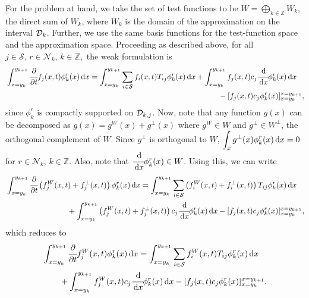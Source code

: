 For the problem at hand, we take the set of test functions to be \(W = \bigoplus\limits_{k\in\mathbb Z} W_k\), the direct sum of \(W_k\), where \(W_k\) is the domain of the approximation on the interval \(\mathcal{D}_k\). Further, we use the same basis functions for the test-function space and the approximation space. Proceeding as described above, for all \(j\in\mathcal S,\,r\in\mathcal N_k\), \(k\in\mathbb Z,\) the weak formulation is 
\begin{align*}
	\begin{multlined}[t]\int_{x=y_k}^{y_{k+1}}\cfrac{\partial}{\partial t} f_j(x,t)\phi^r_k(x)\wrt x = \int_{x=y_k}^{y_{k+1}}\sum_{i\in\calS}  f_i(x,t)T_{ij}\phi^r_k(x)\wrt x  
	+  \int_{x=y_k}^{y_{k+1}} f_j(x,t)c_j\cfrac{\wrt}{\wrt x}\phi^r_k(x)\wrt x \\ {}- [f_j(x,t)c_j\phi^r_k(x)]_{x=y_k}^{x=y_{k+1}}, \end{multlined}
\end{align*}
since \(\phi^r_k\) is compactly supported on \(\mathcal{D}_{k,j}\). Now, note that any function \(g(x)\) can be decomposed as \(g(x) = g^{W}(x)+g^\perp(x)\) where \(g^{W}\in W\) and \(g^\perp \in W^\perp\), the orthogonal complement of \(W\). Since \(g^\perp\) is orthogonal to \(W\), \(\displaystyle\int_{x}g^\perp(x)\phi^r_k(x)\, \mathrm{d} x=0\) for \(r\in\mathcal N_k,\,k\in\mathbb Z\). Also, note that \(\cfrac{\, \mathrm{d}}{\, \mathrm{d} x}\phi^r_k(x)\in W\). Using this, we can write 
\begin{align*}
	\begin{multlined}[t]\int_{x=y_{k}}^{y_{k+1}}\cfrac{\partial}{\partial t} \left(f_j^W(x,t)+f_j^\perp(x,t)\right)\phi^r_k(x)\wrt x 
	= \int_{x=y_k}^{y_{k+1}}\sum_{i\in\calS} \left(f_i^W(x,t)+f_i^\perp(x,t)\right)T_{ij}\phi^r_k(x)\wrt x  
	\\ {}
	+  \int_{x=y_k}^{y_{k+1}} \left(f_j^W(x,t)+f_j^\perp(x,t)\right)c_j\cfrac{\wrt}{\wrt x}\phi^r_k(x)\wrt x - [f_j(x,t)c_j\phi^r_k(x)]_{x=y_k}^{x=y_{k+1}}, \end{multlined}
\end{align*}
	which reduces to
\begin{align}
	\begin{multlined}[t]\int_{x=y_k}^{y_{k+1}}\cfrac{\partial}{\partial t} f_j^W(x,t)\phi^r_k(x)\wrt x = \int_{x=y_k}^{y_{k+1}}\sum_{i\in\calS} f_i^W(x,t)T_{ij}\phi^r_k(x)\wrt x  
	\\{} + \int_{x=y_k}^{y_{k+1}} f_j^W(x,t)c_j\cfrac{\wrt}{\wrt x}\phi^r_k(x)\wrt x - [f_j(x,t)c_j\phi^r_k(x)]_{x=y_k}^{x=y_{k+1}}. \end{multlined} \label{eqn:hash}
\end{align}
